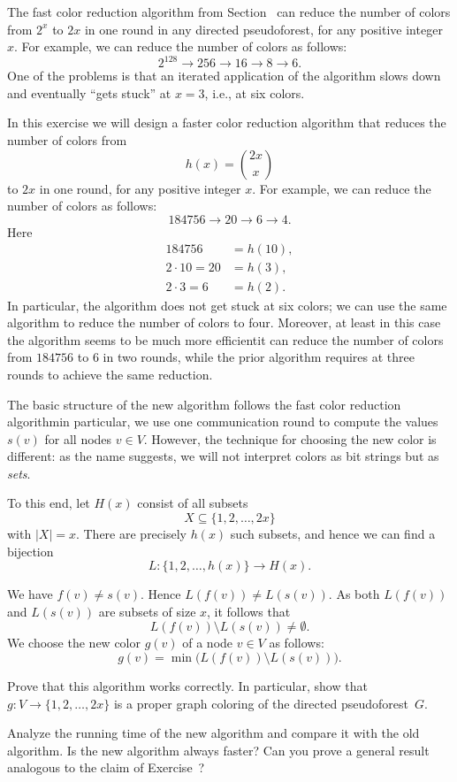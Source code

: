 \begin{exs}\label{ex:dpset}
    The fast color reduction algorithm from Section~ can reduce the number of colors from $2^x$ to $2x$ in one round in any directed pseudoforest, for any positive integer $x$. For example, we can reduce the number of colors as follows:
    \[
        2^{128} \to 256 \to 16 \to 8 \to 6.
    \]
    One of the problems is that an iterated application of the algorithm slows down and eventually ``gets stuck'' at $x = 3$, i.e., at six colors.
    
    In this exercise we will design a faster color reduction algorithm that reduces the number of colors from
    \[
        h(x) = \binom{2x}{x}
    \]
    to $2x$ in one round, for any positive integer $x$. For example, we can reduce the number of colors as follows:
    \[
        184756 \to 20 \to 6 \to 4.
    \]
    Here
    \begin{align*}
        184756 &= h(10), \\
        2 \cdot 10 = 20 &= h(3), \\
        2 \cdot 3 = 6 &= h(2).
    \end{align*}
    In particular, the algorithm does not get stuck at six colors; we can use the same algorithm to reduce the number of colors to four. Moreover, at least in this case the algorithm seems to be much more efficient\mydash it can reduce the number of colors from $184756$ to $6$ in two rounds, while the prior algorithm requires at three rounds to achieve the same reduction.
    
    The basic structure of the new algorithm follows the fast color reduction algorithm\mydash in particular, we use one communication round to compute the values $s(v)$ for all nodes $v \in V$. However, the technique for choosing the new color is different: as the name suggests, we will not interpret colors as bit strings but as \emph{sets}.
    
    To this end, let $H(x)$ consist of all subsets
    \[
        X \subseteq \{1,2,\dotsc,2x\}
    \]
    with $|X| = x$. There are precisely $h(x)$ such subsets, and hence we can find a bijection
    \[
        L\colon \{1,2,\dotsc,h(x)\} \to H(x).
    \]
    
    We have $f(v) \ne s(v)$. Hence $L(f(v)) \ne L(s(v))$. As both $L(f(v))$ and $L(s(v))$ are subsets of size $x$, it follows that
    \[
        L(f(v)) \setminus L(s(v)) \ne \emptyset.
    \]
    We choose the new color $g(v)$ of a node $v \in V$ as follows:
    \[
        g(v) = \min \bigl( L(f(v)) \setminus L(s(v)) \bigr).
    \]

    Prove that this algorithm works correctly. In particular, show that $g\colon V \to \{1,2,\dotsc,2x\}$ is a proper graph coloring of the directed pseudoforest~$G$.
    
    Analyze the running time of the new algorithm and compare it with the old algorithm. Is the new algorithm always faster? Can you prove a general result analogous to the claim of Exercise~?
\end{exs}



